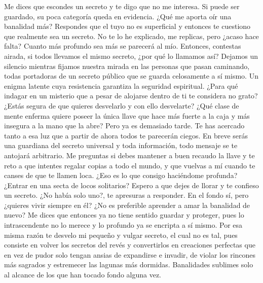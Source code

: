\documentclass[a4paper,11pt,openright,twocolumn]{book}
\begin{document}
 Me dices que escondes un secreto y te digo que no me interesa. Si puede ser guardado, su poca categoría queda en evidencia. ¿Qué me aporta oír una banalidad más? Respondes que el tuyo no es superficial y entonces te cuestiono que realmente sea un secreto. No te lo he explicado, me replicas, pero ¿acaso hace falta? Cuanto más profundo sea más se parecerá al mío. Entonces, contestas airada, si todos llevamos el mismo secreto, ¿por qué lo llamamos así? Dejamos un silencio mientras fijamos nuestra mirada en las personas que pasan caminando, todas portadoras de un secreto público que se guarda celosamente a sí mismo. Un enigma latente cuya resistencia garantiza la seguridad espiritual. ¿Para qué indagar en un misterio que a pesar de alojarse dentro de ti te considera no grato? ¿Estás segura de que quieres desvelarlo y con ello desvelarte? ¿Qué clase de mente enferma quiere poseer la única llave que hace más fuerte a la caja y más insegura a la mano que la abre? Pero ya es demasiado tarde. Te has acercado tanto a esa luz que a partir de ahora todos te parecerán ciegos. En breve serás una guardiana del secreto universal y toda información, todo mensaje se te antojará arbitrario. Me preguntas si debes mantener a buen recaudo la llave y te reto a que intentes regalar copias a todo el mundo, y que vuelvas a mí cuando te canses de que te llamen loca. ¿Eso es lo que consigo haciéndome profunda? ¿Entrar en una secta de locos solitarios? Espero a que dejes de llorar y te confieso un secreto. ¿No había solo uno?, te apresuras a responder. En el fondo sí, pero ¿quieres vivir siempre en él? ¿No es preferible aprender a amar la banalidad de nuevo? Me dices que entonces ya no tiene sentido guardar y proteger, pues lo intrascendente no lo merece y lo profundo ya se encripta a sí mismo. Por esa misma razón te desvelo mi pequeño y vulgar secreto, el cual no es tal, pues consiste en volver los secretos del revés y convertirlos en creaciones perfectas que en vez de pudor solo tengan ansias de expandirse e invadir, de violar los rincones más sagrados y estremecer las lagunas más dormidas. Banalidades sublimes solo al alcance de los que han tocado fondo alguna vez.


\end{document}
